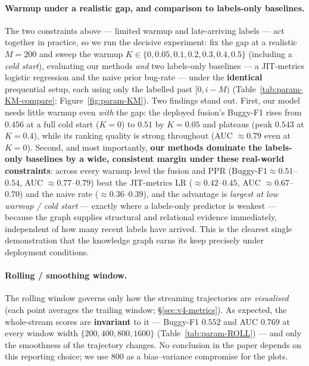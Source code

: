 \documentclass[11pt,a4paper]{article}
\begin{document}
	\paragraph{Warmup under a realistic gap, and comparison to labels-only baselines.}
	The two constraints above --- limited warmup and late-arriving labels --- act
	together in practice, so we run the decisive experiment: fix the gap at a realistic
	$M{=}200$ and sweep the warmup $K\in\{0,0.05,0.1,0.2,0.3,0.4,0.5\}$ (including a
	\emph{cold start}), evaluating our methods \emph{and} two labels-only baselines ---
	a JIT-metrics logistic regression and the naive prior bug-rate --- under the
	\textbf{identical} prequential setup, each using only the labelled past $[0,i{-}M)$
	(Table~\ref{tab:param-KM-compare}; Figure~\ref{fig:param-KM}). Two findings stand
	out. First, our model needs little warmup even \emph{with} the gap: the deployed
	fusion's Buggy-F1 rises from $0.456$ at a full cold start ($K{=}0$) to $0.51$ by
	$K{=}0.05$ and plateaus (peak $0.543$ at $K{=}0.4$), while its ranking quality is
	strong throughout (AUC $\approx0.79$ even at $K{=}0$). Second, and most importantly,
	\textbf{our methods dominate the labels-only baselines by a wide, consistent margin
	under these real-world constraints}: across every warmup level the fusion and PPR
	($\text{Buggy-F1}\approx0.51$--$0.54$, AUC $\approx0.77$--$0.79$) beat the JIT-metrics
	LR ($\approx0.42$--$0.45$, AUC $\approx0.67$--$0.70$) and the naive rate
	($\approx0.36$--$0.39$), and the advantage is \emph{largest at low warmup / cold
	start} --- exactly where a labels-only predictor is weakest --- because the graph
	supplies structural and relational evidence immediately, independent of how many
	recent labels have arrived. This is the clearest single demonstration that the
	knowledge graph earns its keep precisely under deployment conditions.

	\paragraph{Rolling / smoothing window.} The rolling window governs only how the
	streaming trajectories are \emph{visualised} (each point averages the trailing
	window; \S\ref{sec:v4-metrics}). As expected, the whole-stream scores are
	\textbf{invariant} to it --- Buggy-F1 $0.552$ and AUC $0.769$ at every window width
	$\{200,400,800,1600\}$ (Table~\ref{tab:param-ROLL}) --- and only the smoothness of
	the trajectory changes. No conclusion in the paper depends on this reporting
	choice; we use $800$ as a bias--variance compromise for the plots.
\end{document}
